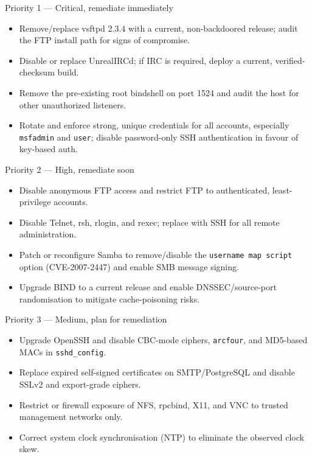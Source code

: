 \documentclass[11pt,a4paper]{article}
\begin{document}
\begin{recbox}{Priority 1 --- Critical, remediate immediately}
\begin{itemize}[leftmargin=1.2em]
\item Remove/replace vsftpd 2.3.4 with a current, non-backdoored release; audit the FTP install path for signs of compromise.
\item Disable or replace UnrealIRCd; if IRC is required, deploy a current, verified-checksum build.
\item Remove the pre-existing root bindshell on port 1524 and audit the host for other unauthorized listeners.
\item Rotate and enforce strong, unique credentials for all accounts, especially \texttt{msfadmin} and \texttt{user}; disable password-only SSH authentication in favour of key-based auth.
\end{itemize}
\end{recbox}

\vspace{0.6em}
\begin{recbox}{Priority 2 --- High, remediate soon}
\begin{itemize}[leftmargin=1.2em]
\item Disable anonymous FTP access and restrict FTP to authenticated, least-privilege accounts.
\item Disable Telnet, rsh, rlogin, and rexec; replace with SSH for all remote administration.
\item Patch or reconfigure Samba to remove/disable the \texttt{username map script} option (CVE-2007-2447) and enable SMB message signing.
\item Upgrade BIND to a current release and enable DNSSEC/source-port randomisation to mitigate cache-poisoning risks.
\end{itemize}
\end{recbox}

\vspace{0.6em}
\begin{recbox}{Priority 3 --- Medium, plan for remediation}
\begin{itemize}[leftmargin=1.2em]
\item Upgrade OpenSSH and disable CBC-mode ciphers, \texttt{arcfour}, and MD5-based MACs in \texttt{sshd\_config}.
\item Replace expired self-signed certificates on SMTP/PostgreSQL and disable SSLv2 and export-grade ciphers.
\item Restrict or firewall exposure of NFS, rpcbind, X11, and VNC to trusted management networks only.
\item Correct system clock synchronisation (NTP) to eliminate the observed clock skew.
\end{itemize}
\end{recbox}
\end{document}
